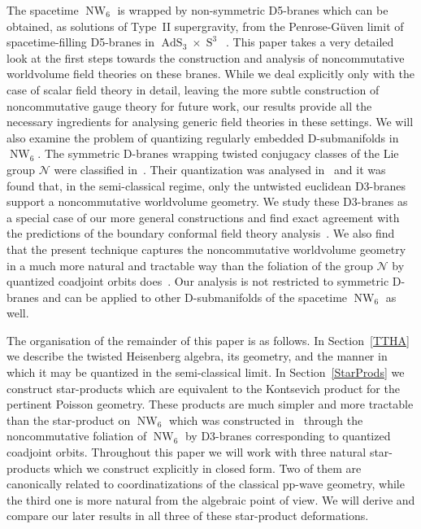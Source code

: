 \documentclass[11pt,a4paper]{article}
\DeclareMathOperator{\AdS}{AdS}
\DeclareMathOperator{\Sphere}{S}
\DeclareMathOperator{\NW}{NW}
\let\S\Sphere
\newcommand{\1}{\mathbb{1}}
\begin{document}
The spacetime $\NW_6$ is wrapped by non-symmetric D5-branes which can
be obtained, as solutions of Type~II supergravity, from the
Penrose-G\"uven limit of spacetime-filling D5-branes in
$\AdS_3\times\S^3$~\cite{KNSanjay1}. This paper takes a very detailed
look at the first steps towards the construction and
analysis of noncommutative worldvolume field theories on these
branes. While we deal explicitly only with the case of scalar field
theory in detail, leaving the more subtle construction of
noncommutative gauge theory for future work, our results provide all
the necessary ingredients for analysing generic field theories in
these settings. We will also examine the problem of quantizing
regularly embedded D-submanifolds in $\NW_6$. The symmetric D-branes
wrapping twisted conjugacy classes of the Lie group $\mathcal{N}$ were
classified in~\cite{SF-OF1}. Their quantization was analysed
in~\cite{HSz1} and it was found that, in the semi-classical regime,
only the untwisted euclidean D3-branes support a noncommutative
worldvolume geometry. We study these D3-branes as a special case of
our more general constructions and find exact agreement with the
predictions of the boundary conformal field theory
analysis~\cite{DAK1}. We also find that the present technique captures
the noncommutative worldvolume geometry in a much more natural and
tractable way than the foliation of the group $\mathcal{N}$ by
quantized coadjoint orbits does~\cite{HSz1}. Our analysis is not
restricted to symmetric D-branes and can be applied to other
D-submanifolds of the spacetime $\NW_6$ as well.

The organisation of the remainder of this paper is as follows. In
Section~\ref{TTHA} we describe the twisted Heisenberg algebra, its
geometry, and the manner in which it may be quantized in the
semi-classical limit. In Section~\ref{StarProds} we construct
star-products which are equivalent to the Kontsevich product for the
pertinent Poisson geometry. These products are much simpler and more
tractable than the star-product on $\NW_6$ which was constructed
in~\cite{HSz1} through the noncommutative foliation of $\NW_6$ by
D3-branes corresponding to quantized coadjoint orbits. Throughout this
paper we will work with three natural star-products which we construct
explicitly in closed form. Two of them are canonically related to
coordinatizations of the classical pp-wave geometry, while the third
one is more natural from the algebraic point of view. We will derive
and compare our later results in all three of these star-product
deformations.
\end{document}
